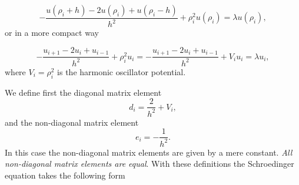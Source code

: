 \documentclass{article}
\begin{document}
\[
-\frac{u(\rho_i+h) -2u(\rho_i) +u(\rho_i-h)}{h^2}+\rho_i^2u(\rho_i)  = \lambda u(\rho_i),
\]
or in  a more compact way

\[
-\frac{u_{i+1} -2u_i +u_{i-1}}{h^2}+\rho_i^2u_i=-\frac{u_{i+1} -2u_i +u_{i-1} }{h^2}+V_iu_i  = \lambda u_i,
\]
where $V_i=\rho_i^2$ is the harmonic oscillator potential.

We define first the diagonal matrix element
\begin{equation*}
   d_i=\frac{2}{h^2}+V_i,
\end{equation*}
and the non-diagonal matrix element
\begin{equation*}
   e_i=-\frac{1}{h^2}.
\end{equation*}
In this case the non-diagonal matrix elements are given by a mere constant.
\emph{All non-diagonal matrix elements are equal}.
With these definitions the Schroedinger equation takes the following form
\end{document}
